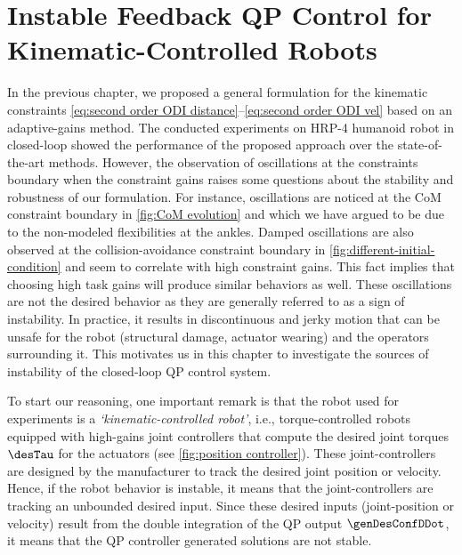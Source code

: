 \graphicspath{{Figures/}}
\chapter{Instable Feedback QP Control for Kinematic-Controlled Robots} \label{chap:instable qp}
In the previous chapter, we proposed a general formulation for the kinematic constraints \eqref{eq:second order ODI distance}--\eqref{eq:second order ODI vel} based on an adaptive-gains method.  
The conducted experiments on HRP-4 humanoid robot in closed-loop showed the performance of the proposed approach over the state-of-the-art methods. 
However, the observation of oscillations at the constraints boundary  when the constraint gains raises some questions about the stability and robustness of our formulation. For instance, oscillations are noticed at the CoM constraint boundary in  \cref{fig:CoM evolution} and which we have argued to be due to the non-modeled flexibilities at the ankles. Damped oscillations are also observed at the collision-avoidance constraint boundary in \cref{fig:different-initial-condition} and seem to correlate with high constraint gains. This fact implies that choosing high task gains will produce similar behaviors as well. These oscillations are not the desired behavior as they are generally referred to as a sign of instability. In practice, it results in discontinuous and jerky motion that can be unsafe for the robot (structural damage, actuator wearing) and the operators surrounding it. This motivates us in this chapter to investigate the sources of instability of the closed-loop QP control system.

To start our reasoning, one important remark is that the robot used for experiments is a \emph{‘kinematic-controlled robot’}, i.e., torque-controlled robots equipped with high-gains joint controllers that compute the desired joint torques $\desTau$ for the actuators (see \cref{fig:position controller}). These joint-controllers are designed by the manufacturer to track the desired joint position or velocity. Hence, if the robot behavior is instable, it means that the joint-controllers are tracking an unbounded desired input.   Since these desired inputs (joint-position or velocity) result from the double integration of the QP output $\genDesConfDDot$, it means that the QP controller generated solutions are not stable. 

